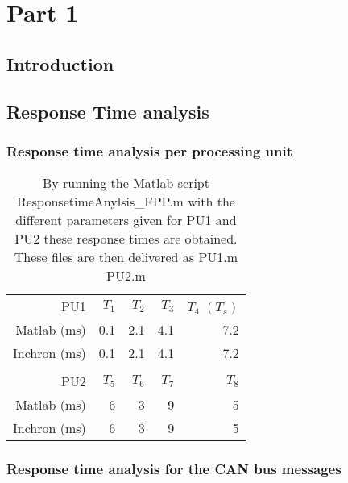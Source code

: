 \chapter{Part 1}

\section{Introduction}

\section{Response Time analysis}



\subsection{Response time analysis per processing unit}

\begin{table}[htbp]
	\centering
	\caption{By running the Matlab script ResponsetimeAnylsis\_FPP.m with the different parameters given for PU1 and PU2 these response times are obtained. These files are then delivered as PU1.m PU2.m}
	\begin{tabular}{rrrrr}
		& & & & \\
		\toprule
		PU1     & $T_1$    & $T_2$    & $T_3$    & $T_4$  $(T_s)$ \\
		\midrule
		Matlab (ms)      & 0.1     & 2.1     & 4.1     & 7.2 \\
		Inchron (ms)	& 0.1     & 2.1     & 4.1     & 7.2 \\
		
		& & & & \\
		\toprule
		PU2     & $T_5$    & $T_6$    & $T_7$    & $T_8$ \\
		\midrule
			Matlab (ms)      & 6       & 3       & 9       & 5 \\
			Inchron (ms)	 & 6       & 3       & 9       & 5 \\
		
	\end{tabular}%
	\label{tab:addlabel}%
\end{table}%


\subsection{ Response time analysis for the CAN bus messages}

